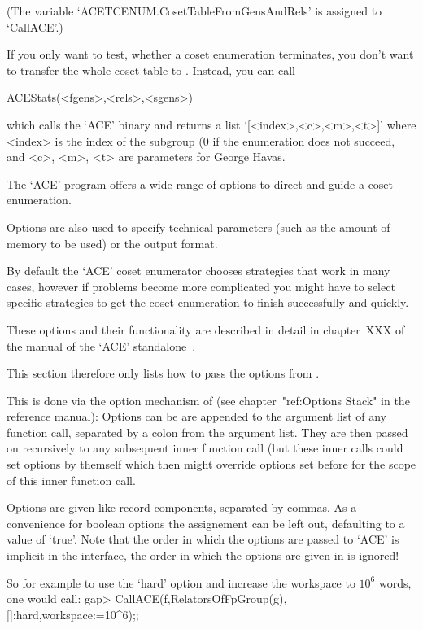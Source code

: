 (The variable `ACETCENUM.CosetTableFromGensAndRels' is assigned to
`CallACE'.)

If you only want to test, whether a coset enumeration terminates, you don't
want to transfer the whole coset table to {\GAP}. Instead, you can call

\>ACEStats(<fgens>,<rels>,<sgens>)

which calls the `ACE' binary and returns a list `[<index>,<c>,<m>,<t>]'
where <index> is the index of the subgroup (0 if the enumeration does not
succeed, and <c>, <m>, <t> are parameters for George Havas.


The `ACE' program offers a wide range of options to direct and guide a
coset enumeration.

Options are also used to specify technical parameters (such as the amount of
memory to be used) or the output format.

By default the `ACE' coset enumerator chooses strategies that work in many 
cases, however if problems become more complicated you might have to select
specific strategies to get the coset enumeration to finish successfully and
quickly.

These options and their functionality are described in detail in chapter~XXX
of the manual of the `ACE' standalone~\cite{aceman}.

This section therefore only lists how to pass the options from {\GAP}.

This is done via the option mechanism of {\GAP} (see
chapter~"ref:Options Stack" in the reference manual):
Options can be are appended to the argument list of any function call,
separated by a colon from the argument list. They are then passed on
recursively to any subsequent inner function call (but these inner calls
could set options by themself which then might override options set before
for the scope of this inner function call.

Options are given like record components, separated by commas. As a
convenience for boolean options the assignement can be left out, defaulting
to a value of `true'. Note that the order in which the options are passed to
`ACE' is implicit in the interface, the order in which the options are given
in {\GAP} is ignored!

So for example to use the `hard' option and increase the workspace to $10^6$
words, one would call:
\begintt
gap> CallACE(f,RelatorsOfFpGroup(g),[]:hard,workspace:=10^6);;
\endtt


